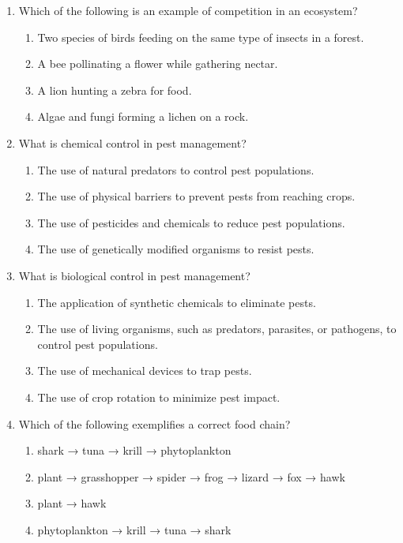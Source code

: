 \documentclass{article}
\begin{document}
\begin{enumerate}
    \item Which of the following is an example of competition in an ecosystem?
    \begin{enumerate}
        \item Two species of birds feeding on the same type of insects in a forest.
        \item A bee pollinating a flower while gathering nectar.
        \item A lion hunting a zebra for food.
        \item Algae and fungi forming a lichen on a rock.
    \end{enumerate}

    \item What is chemical control in pest management?
    \begin{enumerate}
        \item The use of natural predators to control pest populations.
        \item The use of physical barriers to prevent pests from reaching crops.
        \item The use of pesticides and chemicals to reduce pest populations.
        \item The use of genetically modified organisms to resist pests.
    \end{enumerate}

    \item What is biological control in pest management?
    \begin{enumerate}
        \item The application of synthetic chemicals to eliminate pests.
        \item The use of living organisms, such as predators, parasites, or pathogens, to control pest populations.
        \item The use of mechanical devices to trap pests.
        \item The use of crop rotation to minimize pest impact.
    \end{enumerate}

    \item Which of the following exemplifies a correct food chain?
    \begin{enumerate}
        \item shark → tuna → krill → phytoplankton
        \item plant → grasshopper → spider → frog → lizard → fox → hawk
        \item plant → hawk
        \item phytoplankton → krill → tuna → shark
    \end{enumerate}


\end{enumerate}
\end{document}
